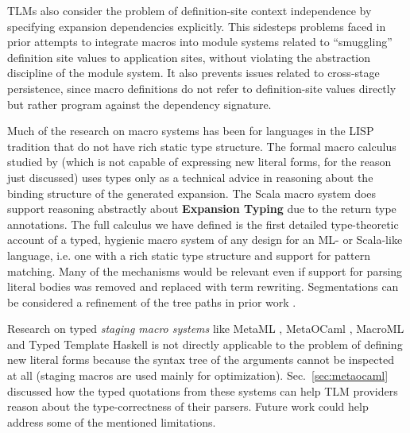 \documentclass[acmsmall]{acmart}
\begin{document}
TLMs also consider the problem of definition-site context independence by specifying expansion dependencies explicitly. This sidesteps problems faced in prior attempts to integrate macros into module systems \cite{culpepper2005syntactic} related to ``smuggling'' definition site values to application sites, without violating the abstraction discipline of the module system. It also prevents issues related to cross-stage persistence, since macro definitions do not refer to definition-site values directly but rather program against the dependency signature.

Much of the research on macro systems has been for languages in the LISP tradition \cite{mccarthy1978history} that do not have rich static type structure. The formal macro calculus studied by \citet{DBLP:conf/esop/HermanW08} (which is not capable of expressing new literal forms, for the reason just discussed) uses types only as a technical advice in reasoning about the binding structure of the generated expansion. The Scala macro system does support reasoning abstractly about \textbf{Expansion Typing} due to the return type annotations. The full calculus we have defined is the first detailed type-theoretic account of a typed, hygienic macro system of any design for an ML- or Scala-like language, i.e. one with a rich static type structure and support for pattern matching. Many of the mechanisms would be relevant even if support for parsing literal bodies was removed and replaced with term rewriting. Segmentations can be considered a refinement of the tree paths in prior work \cite{Herman10:Theory,gorn1965explicit}.

Research on typed \emph{staging macro systems} \cite{DBLP:conf/popl/DaviesP96} like MetaML \cite{Sheard:1999:UMS}, MetaOCaml \cite{DBLP:conf/flops/Kiselyov14}, MacroML \cite{ganz2001macros,DBLP:conf/gpce/TahaJ03} and Typed Template Haskell \cite{tth} is not directly applicable to the problem of defining new literal forms because the syntax tree of the arguments cannot be inspected at all (staging macros are used mainly for optimization). Sec.~\ref{sec:metaocaml} discussed how the typed quotations from these systems can help TLM providers reason about the type-correctness of their parsers. Future work could help address some of the mentioned limitations.
\end{document}
